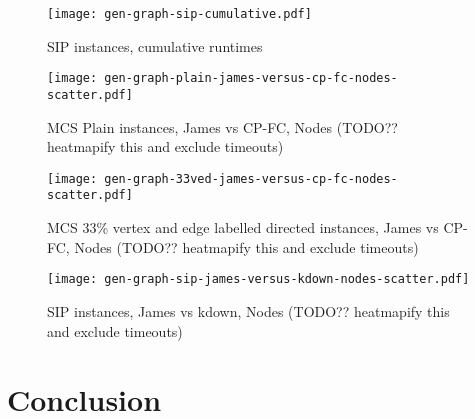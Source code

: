 \documentclass[letterpaper]{article}
\begin{document}
\begin{figure}
    \centering
    \texttt{[image: gen-graph-sip-cumulative.pdf]}
    \caption{SIP instances, cumulative runtimes}\label{figure:sip-cumulative}
\end{figure}

\begin{figure}
    \centering
    \texttt{[image: gen-graph-plain-james-versus-cp-fc-nodes-scatter.pdf]}
    \caption{MCS Plain instances, James vs CP-FC, Nodes (TODO?? heatmapify this
    and exclude timeouts)}\label{figure:plain-james-versus-cp-fc-nodes-scatter}
\end{figure}

\begin{figure}
    \centering
    \texttt{[image: gen-graph-33ved-james-versus-cp-fc-nodes-scatter.pdf]}
    \caption{MCS 33\% vertex and edge labelled directed instances, James vs
    CP-FC, Nodes (TODO?? heatmapify this and exclude
    timeouts)}\label{figure:33ved-james-versus-cp-fc-nodes-scatter}
\end{figure}

\begin{figure}
    \centering
    \texttt{[image: gen-graph-sip-james-versus-kdown-nodes-scatter.pdf]}
    \caption{SIP instances, James vs kdown, Nodes (TODO?? heatmapify this and exclude
    timeouts)}\label{figure:sip-james-versus-kdown-nodes-scatter}
\end{figure}

\section{Conclusion}



\end{document}
